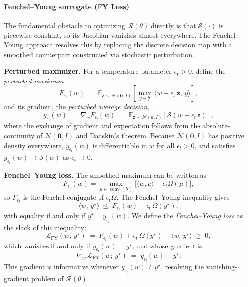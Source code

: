 \documentclass{article}
\begin{document}
\paragraph{Fenchel--Young surrogate (FY Loss)}

The fundamental obstacle to optimizing \(\mathcal{R}(\theta)\) directly is that
\(\mathcal{S}(\cdot)\) is piecewise constant, so its Jacobian vanishes almost
everywhere.  The Fenchel--Young approach resolves this by replacing the
discrete decision map with a smoothed counterpart constructed via stochastic
perturbation.

\medskip
\noindent\textbf{Perturbed maximizer.}
For a temperature parameter \(\epsilon_t > 0\), define the \emph{perturbed
maximum}
\[
  F_{\epsilon_t}(w)
  \;=\;
  \mathbb{E}_{\mathbf{z}\sim\mathcal{N}(\mathbf{0},I)}
  \!\left[
    \max_{y\in\mathcal{Y}}\,\langle w + \epsilon_t\,\mathbf{z},\,y\rangle
  \right],
\]
and its gradient, the \emph{perturbed average decision},
\[
  y_{\epsilon_t}(w)
  \;=\;
  \nabla_{w} F_{\epsilon_t}(w)
  \;=\;
  \mathbb{E}_{\mathbf{z}\sim\mathcal{N}(\mathbf{0},I)}
  \!\left[
    \mathcal{S}(w + \epsilon_t\,\mathbf{z})
  \right],
\]
where the exchange of gradient and expectation follows from the
absolute-continuity of \(\mathcal{N}(\mathbf{0},I)\) and Danskin's theorem.
Because \(\mathcal{N}(\mathbf{0},I)\) has positive density everywhere,
\(y_{\epsilon_t}(w)\) is differentiable in \(w\) for all \(\epsilon_t>0\),
and satisfies \(y_{\epsilon_t}(w)\to\mathcal{S}(w)\) as \(\epsilon_t\to 0\).

\medskip
\noindent\textbf{Fenchel--Young loss.}
The smoothed maximum can be written as
\[
  F_{\epsilon_t}(w)
  =
  \max_{\mu\in\operatorname{conv}(\mathcal{Y})}
  \bigl[\langle w,\mu\rangle-\epsilon_t\Omega(\mu)\bigr],
\]
so \(F_{\epsilon_t}\) is the Fenchel conjugate of \(\epsilon_t\Omega\). The
Fenchel--Young inequality gives
\[
  \langle w,\,y^{\star}\rangle
  \;\leq\;
  F_{\epsilon_t}(w) + \epsilon_t\,\Omega(y^{\star}),
\]
with equality if and only if \(y^{\star}=y_{\epsilon_t}(w)\).  We define the
\emph{Fenchel--Young loss} as the slack of this inequality:
\[
  \mathcal{L}_{\mathrm{FY}}(w;\,y^{\star})
  \;=\;
  F_{\epsilon_t}(w) + \epsilon_t\,\Omega(y^{\star})
  - \langle w,\,y^{\star}\rangle
  \;\geq\; 0,
\]
which vanishes if and only if \(y_{\epsilon_t}(w)=y^{\star}\), and
whose gradient is
\[
  \nabla_{w}\,\mathcal{L}_{\mathrm{FY}}(w;\,y^{\star})
  \;=\;
  y_{\epsilon_t}(w) - y^{\star}.
\]
This gradient is informative whenever \(y_{\epsilon_t}(w)\neq y^{\star}\),
resolving the vanishing-gradient problem of \(\mathcal{R}(\theta)\).
\end{document}
